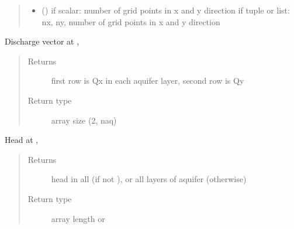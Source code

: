 \documentclass[letterpaper,10pt,english]{sphinxmanual}
\begin{document}
\begin{fulllineitems}
\begin{fulllineitems}
\begin{quote}
\begin{description}
\begin{itemize}
\item {} 
 (\sphinxstyleliteralemphasis{, }) \textendash{} if scalar: number of grid points in x and y direction
if tuple or list: nx, ny, number of grid points in x and y direction

\end{itemize}

\end{description}\end{quote}

\end{fulllineitems}


\begin{fulllineitems}
\label{\detokenize{models/model3d:timml.model.Model3D.disvec}}
Discharge vector at , 
\begin{quote}\begin{description}
\item[{Returns}] \leavevmode
{} \textendash{} first row is Qx in each aquifer layer, second row is Qy

\item[{Return type}] \leavevmode
array size (2, naq)

\end{description}\end{quote}

\end{fulllineitems}


\begin{fulllineitems}
\label{\detokenize{models/model3d:timml.model.Model3D.head}}
Head at , 
\begin{quote}\begin{description}
\item[{Returns}] \leavevmode
{} \textendash{} head in all  (if not ), or all layers of aquifer (otherwise)

\item[{Return type}] \leavevmode
array length  or 


\end{description}
\end{quote}
\end{fulllineitems}
\end{fulllineitems}
\end{document}
